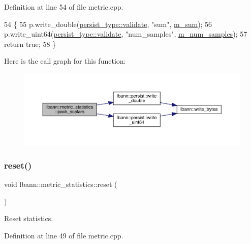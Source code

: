 Definition at line 54 of file metric.\+cpp.


\begin{DoxyCode}
54                                                \{
55   p.write\_double(\hyperlink{namespacelbann_adee41f31f15f3906cbdcce4a1417eb56af9ab05454998236921a6b0e281fae632}{persist\_type::validate}, \textcolor{stringliteral}{"sum"}, \hyperlink{structlbann_1_1metric__statistics_a3481b2bb165e12a52db847f40a70f800}{m\_sum});
56   p.write\_uint64(\hyperlink{namespacelbann_adee41f31f15f3906cbdcce4a1417eb56af9ab05454998236921a6b0e281fae632}{persist\_type::validate}, \textcolor{stringliteral}{"num\_samples"}, 
      \hyperlink{structlbann_1_1metric__statistics_a6633bf91863b7e2327563ac93a9783f7}{m\_num\_samples});
57   \textcolor{keywordflow}{return} \textcolor{keyword}{true};
58 \}
\end{DoxyCode}
Here is the call graph for this function\+:\nopagebreak
\begin{figure}[H]
\begin{center}
\leavevmode
\includegraphics[width=350pt]{structlbann_1_1metric__statistics_a88f5324c96cceb47d723d2acfddb41f1_cgraph}
\end{center}
\end{figure}
\mbox{\label{structlbann_1_1metric__statistics_a3ab2a4cd36c154e495bc8f18c4295907}} 
\subsubsection{\texorpdfstring{reset()}{reset()}}
{\footnotesize\ttfamily void lbann\+::metric\+\_\+statistics\+::reset (\begin{DoxyParamCaption}{ }\end{DoxyParamCaption})}

Reset statistics. 

Definition at line 49 of file metric.\+cpp.


